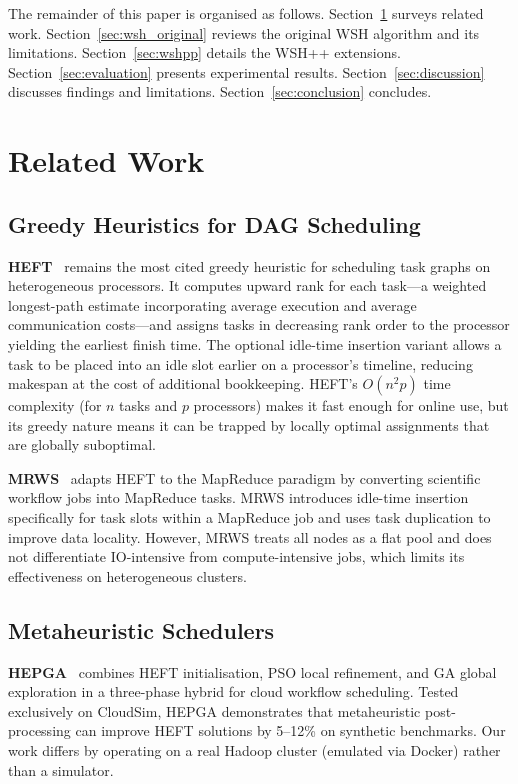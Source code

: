 \documentclass[10pt,twocolumn]{article}
\begin{document}
The remainder of this paper is organised as follows. Section~\ref{sec:related}
surveys related work. Section~\ref{sec:wsh_original} reviews the original WSH
algorithm and its limitations. Section~\ref{sec:wshpp} details the WSH++
extensions. Section~\ref{sec:evaluation} presents experimental results.
Section~\ref{sec:discussion} discusses findings and limitations.
Section~\ref{sec:conclusion} concludes.

\section{Related Work}
\label{sec:related}

\subsection{Greedy Heuristics for DAG Scheduling}

\textbf{HEFT}~\cite{heft2002} remains the most cited greedy heuristic for
scheduling task graphs on heterogeneous processors. It computes upward rank for
each task---a weighted longest-path estimate incorporating average execution and
average communication costs---and assigns tasks in decreasing rank order to
the processor yielding the earliest finish time. The optional idle-time insertion
variant allows a task to be placed into an idle slot earlier on a processor's
timeline, reducing makespan at the cost of additional bookkeeping. HEFT's
$O(n^2 p)$ time complexity (for $n$ tasks and $p$ processors) makes it fast enough
for online use, but its greedy nature means it can be trapped by locally optimal
assignments that are globally suboptimal.

\textbf{MRWS}~\cite{mrws2016} adapts HEFT to the MapReduce paradigm by converting
scientific workflow jobs into MapReduce tasks. MRWS introduces idle-time insertion
specifically for task slots within a MapReduce job and uses task duplication to
improve data locality. However, MRWS treats all nodes as a flat pool and does not
differentiate IO-intensive from compute-intensive jobs, which limits its
effectiveness on heterogeneous clusters.

\subsection{Metaheuristic Schedulers}

\textbf{HEPGA}~\cite{hepga} combines HEFT initialisation, PSO local refinement, and
GA global exploration in a three-phase hybrid for cloud workflow scheduling. Tested
exclusively on CloudSim, HEPGA demonstrates that metaheuristic post-processing can
improve HEFT solutions by 5--12\% on synthetic benchmarks. Our work differs by
operating on a real Hadoop cluster (emulated via Docker) rather than a simulator.
\end{document}
